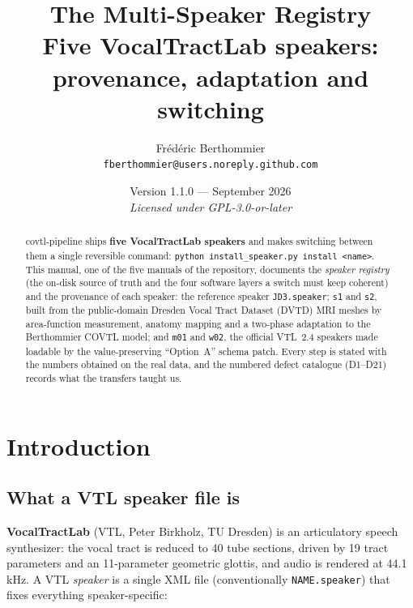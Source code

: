 \documentclass[11pt,a4paper]{article}
\title{\vspace{-1cm}\Huge\bfseries\color{blue!50!black} The Multi-Speaker
Registry\\[0.3em]
\Large\mdseries\color{black!70} Five VocalTractLab speakers: provenance,
adaptation and switching}
\author{\large Frédéric Berthommier\\[0.3em]
\small\texttt{fberthommier@users.noreply.github.com}}
\date{\small Version 1.1.0 --- September 2026\\[0.2em]
\textit{Licensed under GPL-3.0-or-later}}
\newcommand{\speakerfile}[1]{\texttt{#1.speaker}}
\newcommand{\code}[1]{\texttt{#1}}
\begin{document}
\maketitle
\thispagestyle{empty}

\begin{abstract}
\noindent
covtl-pipeline ships \textbf{five VocalTractLab speakers} and makes
switching between them a single reversible command:
\code{python install\_speaker.py install <name>}. This manual, one of
the five manuals of the repository, documents the \emph{speaker
registry} (the on-disk source of truth and the four software layers a
switch must keep coherent) and the provenance of each speaker: the
reference speaker \speakerfile{JD3}; \code{s1} and \code{s2}, built
from the public-domain Dresden Vocal Tract Dataset (DVTD) MRI meshes
by area-function measurement, anatomy mapping and a two-phase
adaptation to the Berthommier COVTL model; and \code{m01} and
\code{w02}, the official VTL~2.4 speakers made loadable by the
value-preserving ``Option~A'' schema patch. Every step is stated with
the numbers obtained on the real data, and the numbered defect
catalogue (D1--D21) records what the transfers taught us.
\end{abstract}

\vspace{0.5em}
\tableofcontents
\vspace{1em}

\section{Introduction}\label{sec:intro}

\subsection{What a VTL speaker file is}

\textbf{VocalTractLab} (VTL, Peter Birkholz, TU Dresden) is an
articulatory speech synthesizer: the vocal tract is reduced to 40
tube sections, driven by 19 tract parameters and an 11-parameter
geometric glottis, and audio is rendered at 44.1\,kHz. A VTL
\emph{speaker} is a single XML file (conventionally \speakerfile{NAME})
that fixes everything speaker-specific:
\end{document}
